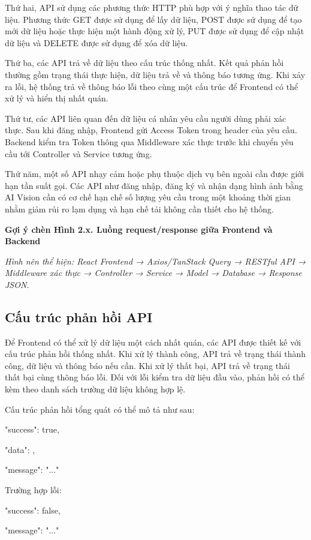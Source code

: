 \documentclass[12pt, a4paper]{report}
\begin{document}
Thứ hai, API sử dụng các phương thức HTTP phù hợp với ý nghĩa thao tác dữ liệu. Phương thức GET được sử dụng để lấy dữ liệu, POST được sử dụng để tạo mới dữ liệu hoặc thực hiện một hành động xử lý, PUT được sử dụng để cập nhật dữ liệu và DELETE được sử dụng để xóa dữ liệu.

Thứ ba, các API trả về dữ liệu theo cấu trúc thống nhất. Kết quả phản hồi thường gồm trạng thái thực hiện, dữ liệu trả về và thông báo tương ứng. Khi xảy ra lỗi, hệ thống trả về thông báo lỗi theo cùng một cấu trúc để Frontend có thể xử lý và hiển thị nhất quán.

Thứ tư, các API liên quan đến dữ liệu cá nhân yêu cầu người dùng phải xác thực. Sau khi đăng nhập, Frontend gửi Access Token trong header của yêu cầu. Backend kiểm tra Token thông qua Middleware xác thực trước khi chuyển yêu cầu tới Controller và Service tương ứng.

Thứ năm, một số API nhạy cảm hoặc phụ thuộc dịch vụ bên ngoài cần được giới hạn tần suất gọi. Các API như đăng nhập, đăng ký và nhận dạng hình ảnh bằng AI Vision cần có cơ chế hạn chế số lượng yêu cầu trong một khoảng thời gian nhằm giảm rủi ro lạm dụng và hạn chế tải không cần thiết cho hệ thống.

\textbf{Gợi ý chèn Hình 2.x. Luồng request/response giữa Frontend và Backend}

\textit{Hình nên thể hiện: React Frontend → Axios/TanStack Query → RESTful API → Middleware xác thực → Controller → Service → Model → Database → Response JSON.}

\subsection{Cấu trúc phản hồi API}Để Frontend có thể xử lý dữ liệu một cách nhất quán, các API được thiết kế với cấu trúc phản hồi thống nhất. Khi xử lý thành công, API trả về trạng thái thành công, dữ liệu và thông báo nếu cần. Khi xử lý thất bại, API trả về trạng thái thất bại cùng thông báo lỗi. Đối với lỗi kiểm tra dữ liệu đầu vào, phản hồi có thể kèm theo danh sách trường dữ liệu không hợp lệ.

Cấu trúc phản hồi tổng quát có thể mô tả như sau:

{

  "success": true,

  "data": {},

  "message": "..."

}

Trường hợp lỗi:

{

  "success": false,

  "message": "..."

}
\end{document}
